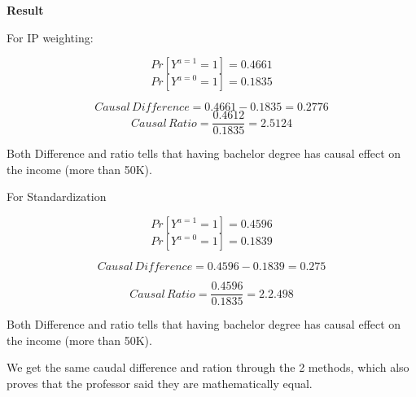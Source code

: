 \documentclass[letterpaper,12pt]{article}
\begin{document}
\textbf{Result}

For IP weighting:

$$
Pr[Y^{a=1}=1]=0.4661
$$
$$
Pr[Y^{a=0}=1]=0.1835
$$

$$Causal\,Difference = 0.4661-0.1835=0.2776$$
$$Causal\,Ratio= \frac{0.4612}{0.1835}=2.5124$$
\par
Both Difference and ratio tells that having bachelor degree has causal effect on  the income (more than 50K). \par


For  Standardization


$$Pr[Y^{a=1}=1]=0.4596$$
$$Pr[Y^{a=0}=1]=0.1839$$

$$Causal\,Difference = 0.4596-0.1839=0.275$$

$$Causal\, Ratio= \frac{0.4596}{0.1835}=2. 2.498$$ 

Both Difference and ratio tells that having bachelor degree has causal effect on  the income (more than 50K).


We get the same caudal difference and ration through the 2 methods, which also proves that the professor said they are mathematically equal.
\end{document}

